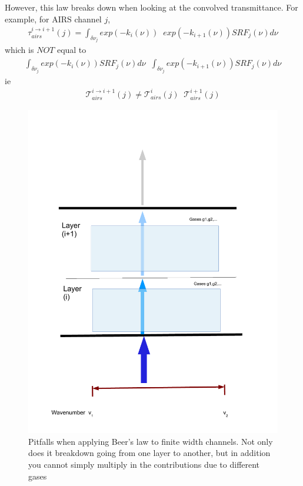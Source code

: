 \documentclass[11pt]{article}
\begin{document}
However, this law breaks down when looking at the convolved transmittance. For example, for AIRS channel $j$,
\begin{eqnarray*}
  \tau_{airs}^{i \rightarrow i+1}(j) = \int_{\delta \nu_{j}} exp(-k_{i}(\nu)) \;\; exp(-k_{i+1}(\nu)) SRF_{j}(\nu) d\nu
\end{eqnarray*}
which is $NOT$ equal to 
\begin{eqnarray*}
  \int_{\delta \nu_{j}} exp(-k_{i}(\nu)) SRF_{j}(\nu) d\nu \;\; \int_{\delta \nu_{j}} exp(-k_{i+1}(\nu)) SRF_{j}(\nu) d\nu
\end{eqnarray*}
ie 
\begin{eqnarray*}
\mathcal{T}_{airs}^{i \rightarrow i+1}(j) \ne  \mathcal{T}_{airs}^{i}(j) \;\; \mathcal{T}_{airs}^{i+1}(j)
\end{eqnarray*}

\begin{figure}
\centering
\includegraphics[width=1\textwidth,height=0.5\textheight]{Figs/twolayers.pdf}
\caption{
Pitfalls when applying Beer's law to finite width channels. Not only does it breakdown going from one layer to 
another, but in addition you cannot simply multiply in the contributions due to different gases
}
\end{figure}
\end{document}
